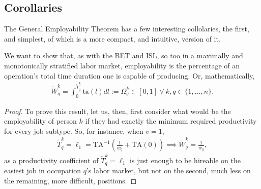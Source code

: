 \documentclass[hidelinks, nonatbib]{elsarticle}
\begin{document}
\subsection{Corollaries}
The General Employability Theorem has a few interesting collolaries, the first, and simplest, of which is a more compact, and intuitive, version of it.
\begin{corollary}
    We want to show that, as with the BET and ISL, so too in a maximally and monotonically stratified labor market, employability is the percentage of an operation's total time duration one is capable of producing. Or, mathematically,
    \begin{gather}
        \tilde{W}_{q}^{k}
        =
        \int_{0}^{\tilde{T}_{q}^{k}}
        \text{ta}(l)
        dl
        :=
        \Omega_{q}^{k}
        \in 
        [0,1]
        \
        \forall
        \
        k,q \in \{1, \dots, n\}
        .
    \end{gather}

    \begin{proof}
        To prove this result, let us, then, first consider what would be the employability of person $k$ if they had exactly the minimum required productivity for every job subtype. So, for instance, when $v = 1$,
        \begin{align}
            \tilde{T}_{q}^{k}
            =
            \ell_1
            =
            \text{TA}^{-1}
            \left(
                \frac{1}{w_q}
                +
                \text{TA}(0)
            \right)
            \implies
            \tilde{W}_{q}^{k}
            =
            \frac{1}{w_q}
            ,
        \end{align}
        as a productivity coefficient of $\tilde{T}_{q}^{k} = \ell_1$ is just enough to be hireable on the easiest job in occupation $q$'s labor market, but not on the second, much less on the remaining, more difficult, positions.
        

\end{proof}
\end{corollary}
\end{document}
